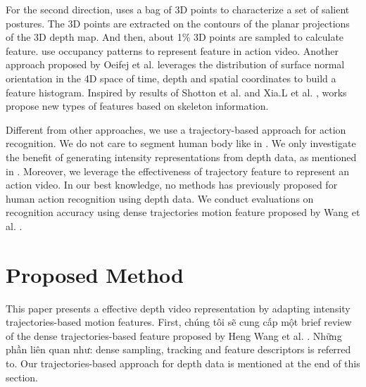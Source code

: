 \documentclass[review]{elsarticle}
\begin{document}
For the second direction, \cite{li2010action} uses a bag of 3D points to characterize a set of salient postures. The 3D points are extracted on the contours of the planar projections of the 3D depth map. And then, about 1\% 3D points are sampled to calculate feature. \cite{vieira2012stop, wang2012robust, wang2012mining} use occupancy patterns to represent feature in action video. Another approach proposed by Oeifej et al. \cite{oreifej2013hon4d} leverages the distribution of surface normal orientation in the 4D space of time, depth and spatial coordinates to build a feature histogram. Inspired by results of Shotton et al. \cite{shotton2013real} and Xia.L et al. \cite{xia2011human}, works \cite{yang2012eigenjoints, wang2012mining} propose new types of features based on skeleton information.

Different from other approaches, we use a trajectory-based approach for action recognition. We do not care to segment human body like in \cite{li2010action,yang2012recognizing}. We only investigate the benefit of generating intensity representations from depth data, as mentioned in \cite{li2010action,yang2012recognizing}. Moreover, we leverage the effectiveness of trajectory feature to represent an action video. In our best knowledge, no methods has previously proposed for human action recognition using depth data. We conduct evaluations on recognition accuracy using dense trajectories motion feature proposed by Wang et al. \cite{wang2011densetraj}.

\section{Proposed Method}
This paper presents a effective depth video representation by adapting intensity trajectories-based motion features. First, chúng tôi sẽ cung cấp một brief review of the dense trajectories-based feature proposed by Heng Wang et al. \cite{wang2011densetraj}. Những phần liên quan như: dense sampling, tracking and feature descriptors is referred to. Our trajectories-based approach for depth data is mentioned at the end of this section.
\end{document}
